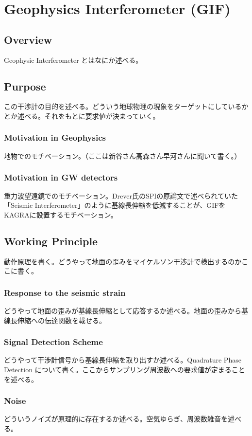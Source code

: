 \chapter{Geophysics Interferometer (GIF)}



\section{Overview} 
Geophysic Interferometer とはなにか述べる。



\section{Purpose} %
この干渉計の目的を述べる。どういう地球物理の現象をターゲットにしているかとか述べる。それをもとに要求値が決まっていく。
\subsection{Motivation in Geophysics}
地物でのモチベーション。（ここは新谷さん高森さん早河さんに聞いて書く。）
\subsection{Motivation in GW detectors}
重力波望遠鏡でのモチベーション。Drever氏のSPIの原論文で述べられていた「Seismic Interferometer」のように基線長伸縮を低減することが、GIFをKAGRAに設置するモチベーション。




\section{Working Principle} %
動作原理を書く。どうやって地面の歪みをマイケルソン干渉計で検出するのかここに書く。
\subsection{Response to the seismic strain}
どうやって地面の歪みが基線長伸縮として応答するか述べる。地面の歪みから基線長伸縮への伝達関数を載せる。
\subsection{Signal Detection Scheme}
どうやって干渉計信号から基線長伸縮を取り出すか述べる。Quadrature Phase Detection について書く。ここからサンプリング周波数への要求値が定まることを述べる。
\subsection{Noise}
どういうノイズが原理的に存在するか述べる。空気ゆらぎ、周波数雑音を述べる。




